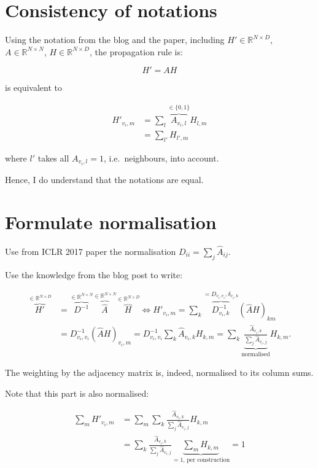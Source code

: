 \section{Consistency of notations}%
\label{sec:consistency}

Using the notation from the blog and the paper, including $H'\in\mathbb{R}^{N\times D}$, $A\in\mathbb{R}^{N\times N}$, $H\in\mathbb{R}^{N\times D}$, the propagation rule is:

\begin{equation}
	H' = A H
\end{equation}

is equivalent to

\begin{equation}
	\begin{split}
		H'_{v_i, m} & = \sum_l \overbrace{A_{v_i, l}}^{\in \{0, 1\}} H_{l, m} \\
		            & = \sum_{l'} H_{l',m}
	\end{split}
\end{equation}

where $l'$ takes all $A_{v_i,l}=1$, i.e.\ neighbours, into account.

Hence, I do understand that the notations are equal.

\section{Formulate normalisation}

Use from ICLR 2017 paper the normalisation $D_{ii} = \sum_j \hat{A}_{ij}$.

Use the knowledge from the blog post to write:

\begin{equation}
	\begin{split}
		\overbrace{H'}^{\in \mathbb{R}^{N\times D}} 
			& = \overbrace{D^{-1}}^{\in\mathbb{R}^{N\times N}} \overbrace{\hat{A}}^{\in \mathbb{R}^{N\times N}} \overbrace{H}^{\in\mathbb{R}^{N\times D}}
			\Leftrightarrow H'_{v_i, m} = \sum_k \overbrace{D^{-1}_{v_i,k}}^{=D_{v_i,v_i}, \delta_{v_i, k}} {(\hat{A} H)}_{km} \\
			& = D^{-1}_{v_i, v_i} (\hat{A} H)_{v_i, m} = D^{-1}_{{v}_i, v_i} \sum_k \hat{A}_{v_i, k} H_{k, m} = \sum_k \underbrace{\frac{\hat{A}_{v_i, k}}{\sum_j \hat{A}_{v_i, j}}}_{\text{normalised}} H_{k, m}.
	\end{split}
\end{equation}

The weighting by the adjacency matrix is, indeed, normalised to its column sums.

Note that this part is also normalised:

\begin{equation}
\begin{split}
	\sum_m H'_{v_i, m} & = \sum_m \sum_k \frac{\hat{A}_{v_i, k}}{\sum_j \hat{A}_{v_i, j}} H_{k, m} \\
	& = \sum_k \frac{\hat{A}_{v_i, k}}{\sum_j \hat{A}_{v_i, j}} \underbrace{\sum_m H_{k,m}}_{=1\text{, per construction}} = 1
\end{split}
\end{equation}

